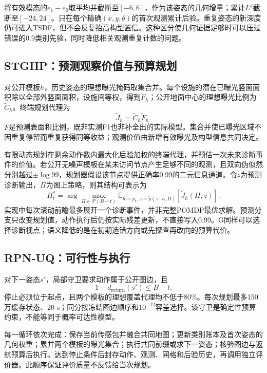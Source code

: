 \documentclass[11pt,a4paper]{article}
\begin{document}
将有效模态的$e_1-e_0$取平均并截断至$[-6,6]$，作为该姿态的几何增量；累计$L^g$截断至$[-24,24]$。只在每个精确$(x,y,\theta)$的首次观测累计后验。重复姿态的新深度仍可进入TSDF，但不会反复抬高构型置信。这种区分使几何证据足够时可以压过错误的0.9类别先验，同时降低相关观测重复计数的问题。

\subsection{STGHP：预测观察价值与预算规划}
对公开模板$h$，历史姿态的理想曝光掩码取集合并。每个设施的潜在已曝光竖面面积除以全部外竖面面积，设施间等权，得到$\widetilde F_h$；公开地面中心的理想曝光比例为$\widetilde C_h$。终端规划代理为
\begin{equation}
\widetilde J_h=\widetilde C_h\widetilde F_h.
\label{eq:proxy}
\end{equation}
$\widetilde F$是预测表面积比例，既非实测F1也非补全出的实际模型。集合并使已曝光区域不因重复停留而重复获得同等收益；观测价值由新增有效曝光及构型信息共同决定。

有限动态规划在剩余动作数内最大化后验加权的终端代理，并预估一次未来诊断事件的价值。若公开无噪声模板在某未访问节点产生足够不同的观测，且双向伪似然分别越过$\pm\log99$，规划器假设该节点提供正确率0.99的二元信息通道。令$z$为预测诊断输出，$\Pi$为图上策略，则其结构可表示为
\begin{equation}
\Pi_t^*=\arg\max_{\Pi\in\mathcal P(B-t)}
\mathbb E_{h\sim p_t,\,z\sim\widetilde p(z\mid h,\Pi)}
[\widetilde J_h(\Pi,z)] .
\label{eq:planning}
\end{equation}
实现中每次滚动前瞻最多展开一个诊断事件，并非完整POMDP最优求解。预测分支只改变规划值，动作执行后仍按实际残差更新，不直接写入0.99。G同样可以选择诊断视点；语义降低的是在初期选错方向或先探查再改向的预算代价。

\subsection{RPN-UQ：可行性与执行}
对下一姿态$s'$，局部守卫要求动作属于公开图边，且
\begin{equation}
1+d_{\mathrm{return}}(s')\le B-t.
\end{equation}
停止必须位于起点，且两个模板的理想覆盖代理均不低于80\%。每次规划最多150万缓存状态、20 s；同分按冻结图边顺序和$10^{-12}$容差选择。该守卫是确定性预算约束，不能等同于概率可达性模型。

每一循环依次完成：保存当前传感包并融合共同地图；更新类别账本及首次姿态的几何权重；累并两个模板的曝光集合；执行共同前缀或求下一姿态；核验图边与返航预算后执行。达到停止条件后封存动作、观测、网格和后验历史，再调用独立评价器。此顺序保证评价质量不反馈给当次规划。
\end{document}
